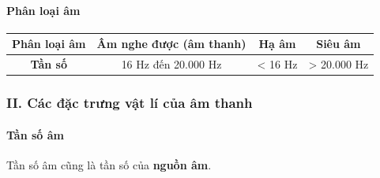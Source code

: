\paragraph{Phân loại âm}
\begin{center}
\begin{tabular}{|c|c|c|c|}
\hline 
\textbf{Phân loại âm} & \textbf{Âm nghe được (âm thanh)} & \textbf{Hạ âm} & \textbf{Siêu âm} \\ 
\hline 
\textbf{Tần số} & 16 Hz đến 20.000 Hz & < 16 Hz & > 20.000 Hz \\ 
\hline 
\end{tabular} 
\end{center}
\subsubsection*{II. Các đặc trưng vật lí của âm thanh}
\setcounter{paragraph}{0}
\paragraph{Tần số âm}
Tần số âm cũng là tần số của \textbf{nguồn âm}.
